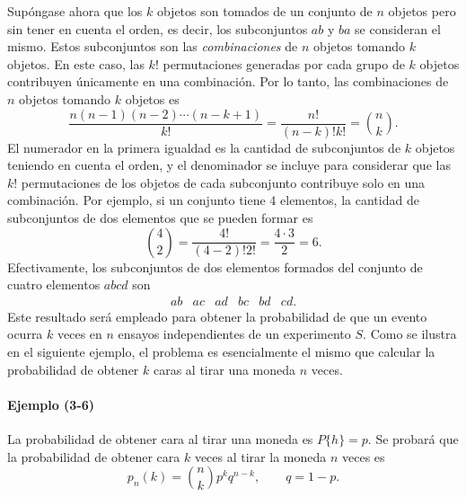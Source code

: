 \documentclass[a4paper]{report}
\begin{document}
Supóngase ahora que los \(k\) objetos son tomados de un conjunto de \(n\) objetos pero sin tener en cuenta el orden, es decir, los subconjuntos \(ab\) y \(ba\) se consideran el mismo. Estos subconjuntos son las \emph{combinaciones} de \(n\) objetos tomando \(k\) objetos. En este caso, las \(k!\) permutaciones generadas por cada grupo de \(k\) objetos contribuyen únicamente en una combinación. Por lo tanto, las combinaciones de \(n\) objetos tomando \(k\) objetos es
\[
 \frac{n(n-1)(n-2)\cdots(n-k+1)}{k!}=\frac{n!}{(n-k)!k!}=\binom{n}{k}.
\]
El numerador en la primera igualdad es la cantidad de subconjuntos de \(k\) objetos teniendo en cuenta el orden, y el denominador se incluye para considerar que las \(k!\) permutaciones de los objetos de cada subconjunto contribuye solo en una combinación. Por ejemplo, si un conjunto tiene 4 elementos, la cantidad de subconjuntos de dos elementos que se pueden formar es
\[
 \binom{4}{2}=\frac{4!}{(4-2)!2!}=\frac{4\cdot3}{2}=6.
\]
Efectivamente, los subconjuntos de dos elementos formados del conjunto de cuatro elementos \(abcd\) son
\[
 \begin{array}{llllll}
  ab & ac & ad & bc & bd & cd.
 \end{array}
\]
Este resultado será empleado para obtener la probabilidad de que un evento ocurra \(k\) veces en \(n\) ensayos independientes de un experimento \(S\). Como se ilustra en el siguiente ejemplo, el problema es esencialmente el mismo que calcular la probabilidad de obtener \(k\) caras al tirar una moneda \(n\) veces.

\paragraph{Ejemplo (3-6)} La probabilidad de obtener cara al tirar una moneda es \(P\{h\}=p\). Se probará que la probabilidad de obtener cara \(k\) veces al tirar la moneda \(n\) veces es
\begin{equation}\label{eq:binomial_density_function}
 p_n(k)=\binom{n}{k}p^kq^{n-k},\qquad q=1-p.
\end{equation}
\end{document}
